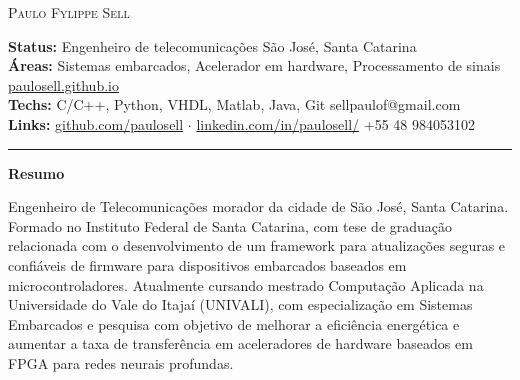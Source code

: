 \documentclass[10pt,A4]{article}
\newcommand{\sectionspace}{
	\vspace{0.1cm}
}
\newcommand{\cvsection}[1]
{
	\begin{center}
		\large\textcolor{sectcol}{\textbf{#1}}
	\end{center}
	\sectionspace
}
\newcommand{\metasection}[2]
{
\footnotesize{#2} \hspace*{\fill} \footnotesize{#1}\\[1pt]
}
\begin{document}
\pagestyle{fancy}	








\vspace{-8pt}
\begin{center}
	\HUGE \textsc{Paulo Fylippe Sell} \\[2pt]
\end{center}



\vspace{6pt}


\metasection{São José, Santa Catarina}{\textbf{Status:} Engenheiro de telecomunicações}
\metasection{\href{https://paulosell.github.io}{paulosell.github.io}}{\textbf{Áreas:} 
Sistemas embarcados, Acelerador em hardware, Processamento de sinais}
\metasection{sellpaulof@gmail.com}{\textbf{Techs:} C/C++, Python, VHDL, Matlab, Java, Git}
\metasection{+55 48 984053102}{\textbf{Links:} \href{https://github.com/paulosell}{github.com/paulosell} $\cdot$ \href{https://www.linkedin.com/in/paulosell/}{linkedin.com/in/paulosell/}} 
\vspace{-2pt}
\textcolor{softcol}{\hrule}
\vspace{6pt}

\normalsize

\vspace{-6pt}
\cvsection{Resumo}
Engenheiro de Telecomunicações morador da cidade de São José, Santa Catarina. Formado no Instituto Federal de Santa Catarina, com tese de graduação relacionada com o desenvolvimento de um framework para atualizações seguras e confiáveis de firmware para dispositivos embarcados baseados em microcontroladores. Atualmente cursando mestrado Computação Aplicada na Universidade do Vale do Itajaí (UNIVALI), com especialização em Sistemas Embarcados e pesquisa com objetivo de melhorar a eficiência energética e aumentar a taxa de transferência em aceleradores de hardware baseados em FPGA para redes neurais profundas.\\
\end{document}
